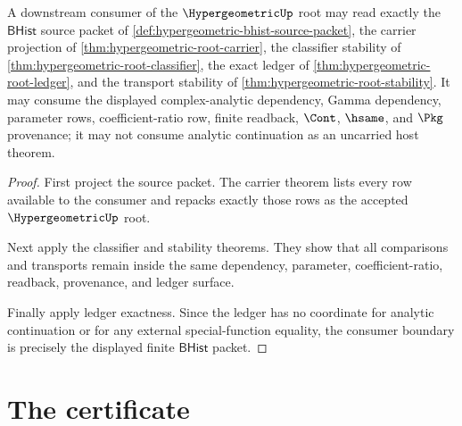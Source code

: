 \begin{theorem}
\label{thm:hypergeometric-root-consumer-boundary}
A downstream consumer of the $\HypergeometricUp$ root may read exactly the
$\mathsf{BHist}$ source packet of
\autoref{def:hypergeometric-bhist-source-packet}, the carrier projection of
\autoref{thm:hypergeometric-root-carrier}, the classifier stability of
\autoref{thm:hypergeometric-root-classifier}, the exact ledger of
\autoref{thm:hypergeometric-root-ledger}, and the transport stability of
\autoref{thm:hypergeometric-root-stability}. It may consume the displayed
complex-analytic dependency, Gamma dependency, parameter rows,
coefficient-ratio row, finite readback, $\Cont$, $\hsame$, and $\Pkg$
provenance; it may not consume analytic continuation as an uncarried host
theorem.
\end{theorem}
\begin{proof}
First project the source packet. The carrier theorem lists every row available
to the consumer and repacks exactly those rows as the accepted
$\HypergeometricUp$ root.

Next apply the classifier and stability theorems. They show that all comparisons
and transports remain inside the same dependency, parameter, coefficient-ratio,
readback, provenance, and ledger surface.

Finally apply ledger exactness. Since the ledger has no coordinate for analytic
continuation or for any external special-function equality, the consumer
boundary is precisely the displayed finite $\mathsf{BHist}$ packet.
\end{proof}

\section{The certificate}
\label{sec:hypergeometric-certificate}

